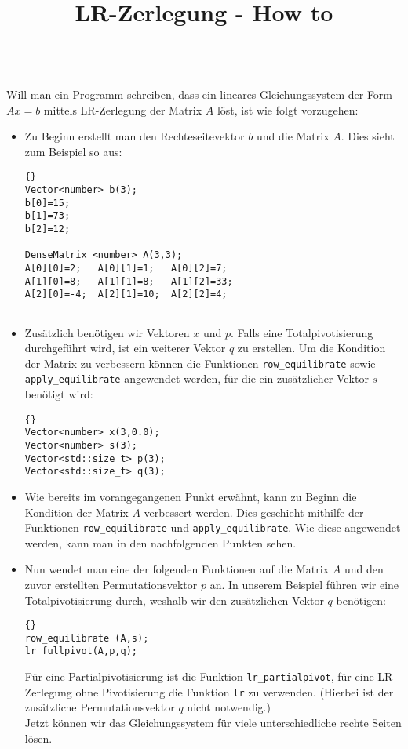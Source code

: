 \documentclass[a4paper,11pt]{article}
\theoremstyle{definition}
\begin{document}
\title{\textbf{LR-Zerlegung - How to}} \\
Will man ein Programm schreiben, dass ein lineares Gleichungssystem der Form $Ax=b$ mittels LR-Zerlegung der Matrix $A$ löst, ist wie folgt vorzugehen:\\
\begin{itemize}
\item Zu Beginn erstellt man den Rechteseitevektor $b$ und die Matrix $A$. Dies sieht zum Beispiel so aus:
{\footnotesize{\begin{lstlisting}{}
Vector<number> b(3);
b[0]=15;
b[1]=73;
b[2]=12;
      
DenseMatrix <number> A(3,3);
A[0][0]=2;   A[0][1]=1;   A[0][2]=7;
A[1][0]=8;   A[1][1]=8;   A[1][2]=33;
A[2][0]=-4;  A[2][1]=10;  A[2][2]=4;
        
\end{lstlisting}}}
\item Zusätzlich benötigen wir Vektoren $x$ und $p$. Falls eine Totalpivotisierung durchgeführt wird, ist ein weiterer Vektor $q$ zu erstellen. Um die Kondition der Matrix zu verbessern können die Funktionen \lstinline{row_equilibrate} sowie \lstinline{apply_equilibrate} angewendet werden, für die ein zusätzlicher Vektor $s$ benötigt wird:
{\footnotesize{\begin{lstlisting}{}
Vector<number> x(3,0.0);
Vector<number> s(3);
Vector<std::size_t> p(3);
Vector<std::size_t> q(3);
\end{lstlisting}}}
\item Wie bereits im vorangegangenen Punkt erwähnt, kann zu Beginn die Kondition der Matrix $A$ verbessert werden. Dies geschieht mithilfe der Funktionen \lstinline{row_equilibrate} und \lstinline{apply_equilibrate}. Wie diese angewendet werden, kann man in den  nachfolgenden Punkten sehen.
    \item Nun wendet man eine der folgenden  Funktionen auf die Matrix $A$ und den zuvor erstellten Permutationsvektor $p$ an. In unserem Beispiel führen wir eine Totalpivotisierung durch, weshalb wir den zusätzlichen Vektor $q$ benötigen:
{\footnotesize{\begin{lstlisting}{}
row_equilibrate (A,s);
lr_fullpivot(A,p,q);
\end{lstlisting}}}
    Für eine Partialpivotisierung ist die Funktion \lstinline{lr_partialpivot}, für eine LR-Zerlegung ohne Pivotisierung die Funktion \lstinline{lr} zu verwenden. (Hierbei ist der zusätzliche Permutationsvektor $q$ nicht notwendig.)\\
    Jetzt können wir das Gleichungssystem für viele unterschiedliche rechte Seiten lösen. 

\end{itemize}
\end{document}
